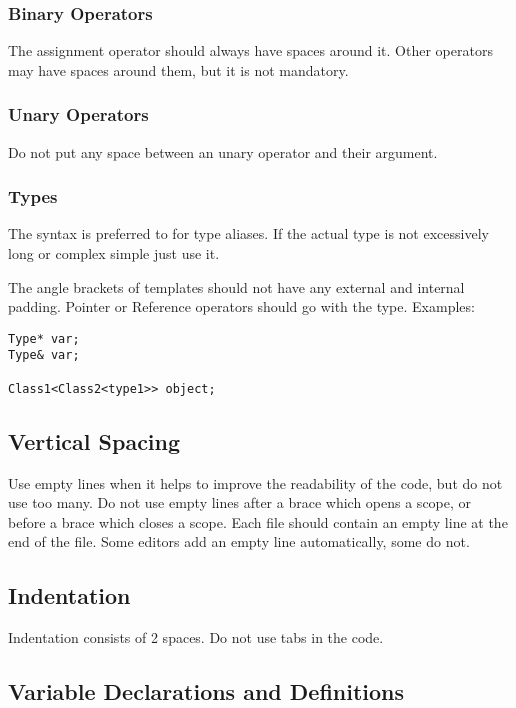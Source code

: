\subsubsection{Binary Operators}
The assignment operator should always have spaces around it.
Other operators may have spaces around them, but it is not mandatory.

\subsubsection{Unary Operators}
Do not put any space between an unary operator and their argument.

\subsubsection{Types}
The  syntax is preferred to  for type aliases.
If the actual type is not excessively long or complex simple just use it.

The angle brackets of templates should not have any external and internal padding.
Pointer or Reference operators should go with the type.
Examples:
\begin{lstlisting}
Type* var;
Type& var;

Class1<Class2<type1>> object;
\end{lstlisting}

\subsection{Vertical Spacing}
Use empty lines when it helps to improve the readability of the code, but do not use too many.
Do not use empty lines after a brace which opens a scope,
or before a brace which closes a scope.
Each file should contain an empty line at the end of the file.
Some editors add an empty line automatically, some do not.

\subsection{Indentation}
Indentation consists of 2 spaces.
Do not use tabs in the code.

\subsection{Variable Declarations and Definitions}

